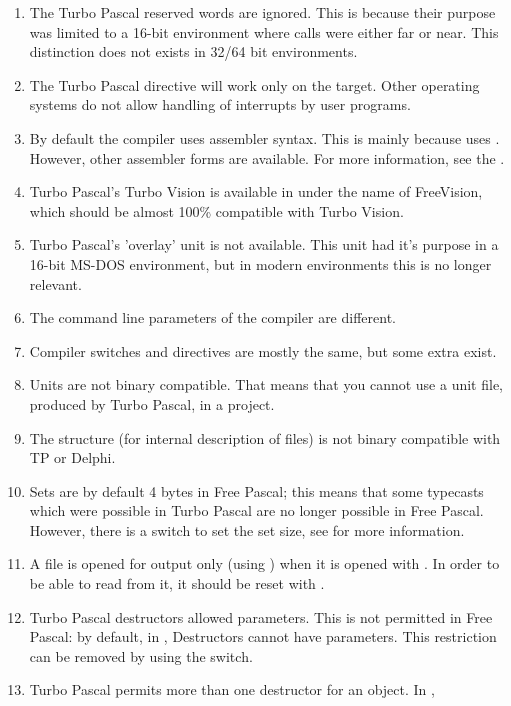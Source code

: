 \begin{enumerate}
\item The Turbo Pascal reserved words  are ignored.
This is because their purpose was limited to a 16-bit environment where
calls were either far or near. This distinction does not exists in 32/64 bit
environments.
\item The Turbo Pascal  directive will work only on the \fpc \dos target.
Other operating systems do not allow handling of interrupts by user
programs.
\item By default the \fpc compiler uses   assembler syntax.
This is mainly because \fpc uses \gnu {}. However, other assembler
forms are available. For more information, see the \progref.
\item Turbo Pascal's Turbo Vision is available in \fpc under the name of
FreeVision, which should be almost 100\% compatible with Turbo Vision.
\item Turbo Pascal's 'overlay' unit is not available. This unit had it's
purpose in a 16-bit MS-DOS environment, but in modern environments this is
no longer relevant.
\item The command line parameters of the compiler are different.
\item Compiler switches and directives are mostly the same, but some extra
exist.
\item Units are not binary compatible. That means that you cannot use a
 unit file, produced by Turbo Pascal, in a \fpc project.
\item The \fpc {} structure (for internal description of files) is not
binary compatible with TP or Delphi.
\item Sets are by default 4 bytes in Free Pascal; this means that some typecasts
which were possible in Turbo Pascal are no longer possible in Free Pascal.
However, there is a switch to set the set size, see \progref for more
information.
\item A file is opened for output only (using ) when it is
opened with . In order to be able to read from it, it should
be reset with .
\item Turbo Pascal destructors allowed parameters. This is not
permitted in Free Pascal: by default, in \fpc, Destructors cannot have parameters.
This restriction can be removed by using the  switch.
\item Turbo Pascal permits more than one destructor for an object. In \fpc,

\end{enumerate}
